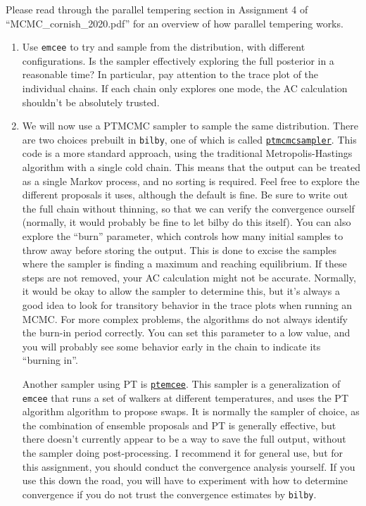 \documentclass[
    aps,
    10pt,
    prd,
    notitlepage,
    onecolumn,s
    tightenlines,
    nofootinbib]{revtex4-1}
\newcommand{\software}[1]{\texttt{#1}}
\begin{document}
\begin{enumerate}
Please read through the parallel tempering section in Assignment 4 of ``MCMC\_cornish\_2020.pdf'' for an overview of how parallel tempering works. 
\begin{enumerate}
\item 
Use \software{emcee} to try and sample from the distribution, with different configurations. Is the sampler effectively exploring the full posterior in a reasonable time? In particular, pay attention to the trace plot of the individual chains.
If each chain only explores one mode, the AC calculation shouldn't be absolutely trusted.
\item 
We will now use a PTMCMC sampler to sample the same distribution.
There are two choices prebuilt in \software{bilby}, one of which is called \href{https://github.com/jellis18/PTMCMCSampler/}{\software{ptmcmcsampler}}.
This code is a more standard approach, using the traditional Metropolis-Hastings algorithm with a single cold chain. 
This means that the output can be treated as a single Markov process, and no sorting is required.
Feel free to explore the different proposals it uses, although the default is fine.
Be sure to write out the full chain without thinning, so that we can verify the convergence ourself (normally, it would probably be fine to let bilby do this itself).
You can also explore the ``burn'' parameter, which controls how many initial samples to throw away before storing the output. 
This is done to excise the samples where the sampler is finding a maximum and reaching equilibrium.
If these steps are not removed, your AC calculation might not be accurate.
Normally, it would be okay to allow the sampler to determine this, but it's always a good idea to look for transitory behavior in the trace plots when running an MCMC.
For more complex problems, the algorithms do not always identify the burn-in period correctly.
You can set this parameter to a low value, and you will probably see some behavior early in the chain to indicate its ``burning in''.

Another sampler using PT is \href{https://github.com/willvousden/ptemcee}{\software{ptemcee}}.
This sampler is a generalization of \software{emcee} that runs a set of walkers at different temperatures, and uses the PT algorithm algorithm to propose swaps.
It is normally the sampler of choice, as the combination of ensemble proposals and PT is generally effective, but there doesn't currently appear to be a way to save the full output, without the sampler doing post-processing.
I recommend it for general use, but for this assignment, you should conduct the convergence analysis yourself.
If you use this down the road, you will have to experiment with how to determine convergence if you do not trust the convergence estimates by \software{bilby}.

\end{enumerate}

\end{enumerate}
\end{document}
